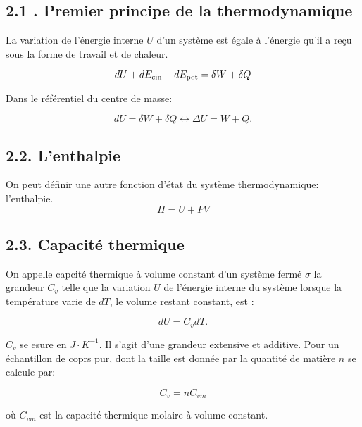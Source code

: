 \documentclass[french, a4paper, 10pt, twocolumn, landscape]{article}
\begin{document}
\subsection*{2.1 . Premier principe de la thermodynamique}

La variation de l'énergie interne $U$ d'un système est égale à l'énergie qu'il a reçu sous la forme de travail et de chaleur.

\begin{equation}
    dU + dE_{\rm cin}+dE_{\rm pot}=\delta W+\delta Q
\end{equation}

Dans le référentiel du centre de masse:

 \begin{equation}
     dU = \delta W + \delta Q \leftrightarrow \Delta U = W +Q.
 \end{equation}

\subsection*{2.2. L'enthalpie}

On peut définir une autre fonction d'état du système thermodynamique: l'enthalpie.
\begin{equation}
    H=U+PV
\end{equation}

\subsection*{2.3. Capacité thermique}
 
On appelle capcité thermique à volume constant d'un système fermé $\sigma$ la grandeur $C_v$ telle que la variation $U$ de l'énergie interne du système lorsque la température varie de $dT$, le volume restant constant, est : 

\begin{equation}
    dU = C_vdT.
\end{equation}

$C_v$ se  esure en $J\cdot K^{-1}$. Il s'agit d'une grandeur extensive et additive. Pour un échantillon de coprs pur, dont la taille est donnée par la quantité de matière $n$ se calcule par:

\begin{equation}
    C_v=nC_{vm}
\end{equation}

où $C_{vm}$ est la capacité thermique molaire à volume constant.\medskip
\end{document}
